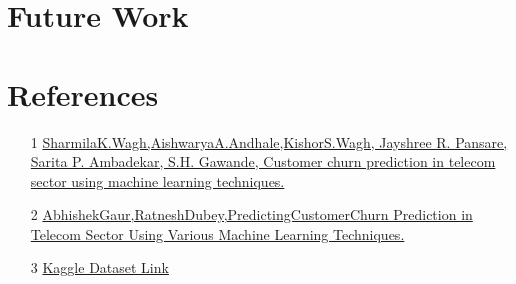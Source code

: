 \documentclass{article}
\begin{document}
\section{Future Work}

\section{References}
\begin{enumerate}

    \item [1] \href{https://www.sciencedirect.com/science/article/pii/S26667207 23001443?via%3Dihub}{SharmilaK.Wagh,AishwaryaA.Andhale,KishorS.Wagh, Jayshree R. Pansare, Sarita P. Ambadekar, S.H. Gawande, Customer churn prediction in telecom sector using machine learning techniques.}

    \item [2] \href{https://ieeexplore.ieee.org/document/8933783}{AbhishekGaur,RatneshDubey,PredictingCustomerChurn Prediction in Telecom Sector Using Various Machine Learning Techniques.}

    \item [3] \href{https://ieeexplore.ieee.org/document/8933783}{Kaggle Dataset Link}


\end{enumerate}
\end{document}
